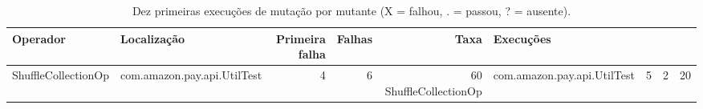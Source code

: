 \begin{table}[htbp]
\centering
\caption{Dez primeiras execuções de mutação por mutante (X = falhou, . = passou, ? = ausente).}
\label{tab:10-first-execs-amazon}
\begin{tabular}{llrrrl}
\toprule
Operador & Localização & Primeira falha & Falhas & Taxa & Execuções \\
\midrule
ShuffleCollectionOp & com.amazon.pay.api.UtilTest & 4 & 6 & 60%
ShuffleCollectionOp & com.amazon.pay.api.UtilTest & 5 & 2 & 20%
\bottomrule
\end{tabular}
\end{table}
